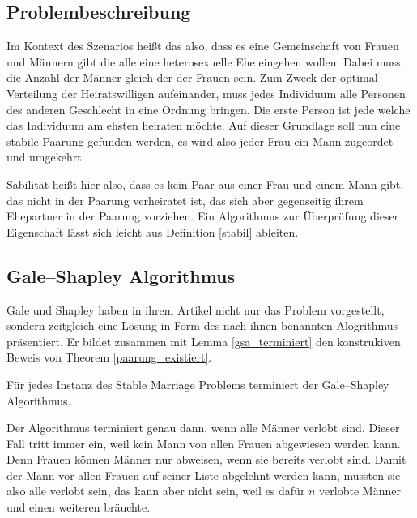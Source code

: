 \subsection{Problembeschreibung}

Im Kontext des Szenarios heißt das also, dass es eine Gemeinschaft von Frauen und Männern gibt die alle eine heterosexuelle Ehe eingehen wollen. Dabei muss die Anzahl der Männer gleich der der Frauen sein. Zum Zweck der optimal Verteilung der Heiratswilligen aufeinander, muss jedes Individuum alle Personen des anderen Geschlecht in eine Ordnung bringen. Die erste Person ist jede welche das Individuum am ehsten heiraten möchte. Auf dieser Grundlage soll nun eine stabile Paarung gefunden werden, es wird also jeder Frau ein Mann zugeordet und umgekehrt.

Sabilität heißt hier also, dass es kein Paar aus einer Frau und einem Mann gibt, das nicht in der Paarung verheiratet ist, das sich aber gegenseitig ihrem Ehepartner in der Paarung vorziehen. Ein Algorithmus zur Überprüfung dieser Eigenschaft lässt sich leicht aus Definition \ref{stabil} ableiten.



\subsection{Gale–Shapley Algorithmus}

Gale und Shapley haben in ihrem Artikel \cite{Gale:1962} nicht nur das Problem vorgestellt, sondern zeitgleich eine Lösung in Form des nach ihnen benannten Alogrithmus präsentiert. Er bildet zusammen mit Lemma \ref{gsa_terminiert} den konstrukiven Beweis von Theorem \ref{paarung_existiert}.



\begin{Lemma}
\label{gsa_terminiert}
  Für jedes Instanz des Stable Marriage Problems terminiert der Gale–Shapley Algorithmus.
\end{Lemma}

\begin{Beweis}
\label{gsa_terminiert_bew}
  Der Algorithmus terminiert genau dann, wenn alle Männer verlobt sind. Dieser Fall tritt immer ein, weil kein Mann von allen Frauen abgewiesen werden kann. Denn Frauen können Männer nur abweisen, wenn sie bereits verlobt sind. Damit der Mann vor allen Frauen auf seiner Liste abgelehnt werden kann, müssten sie also alle verlobt sein, das kann aber nicht sein, weil es dafür $n$ verlobte Männer und einen weiteren bräuchte.
\end{Beweis}

